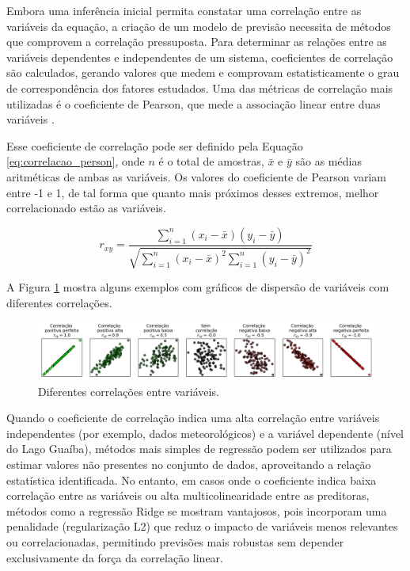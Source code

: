 Embora uma inferência inicial permita constatar uma correlação entre as variáveis da equação, a criação de um modelo de previsão necessita de métodos que comprovem a correlação pressuposta. Para determinar as relações entre as variáveis dependentes e independentes de um sistema, coeficientes de correlação são calculados, gerando valores que medem e comprovam estatisticamente o grau de correspondência dos fatores estudados. Uma das métricas de correlação mais utilizadas é o coeficiente de Pearson, que mede a associação linear entre duas variáveis \cite{kirch2008}. 

Esse coeficiente de correlação pode ser definido pela Equação \ref{eq:correlacao_person}, onde $n$ é o total de amostras, $\bar{x}$ e $\bar{y}$ são as médias aritméticas de ambas as variáveis. Os valores do coeficiente de Pearson variam entre -1 e 1, de tal forma que quanto mais próximos desses extremos, melhor correlacionado estão as variáveis.

\begin{equation}
    r_{xy} = \frac{\sum_{i=1}^n (x_i - \bar{x})(y_i - \bar{y})}{\sqrt{\sum_{i=1}^n (x_i - \bar{x})^2 \sum_{i=1}^n (y_i - \bar{y})^2}}
    \label{eq:correlacao_person}
\end{equation}

A Figura \ref{fig:correlacoes} mostra alguns exemplos com gráficos de dispersão de variáveis com diferentes correlações.

\begin{figure}[H]
	\caption{\label{fig:correlacoes}Diferentes correlações entre variáveis.}
	\begin{center}
		\includegraphics[scale=0.4]{figuras/correlations.png}
	\end{center}
\end{figure}

Quando o coeficiente de correlação indica uma alta correlação entre variáveis independentes (por exemplo, dados meteorológicos) e a variável dependente (nível do Lago Guaíba), métodos mais simples de regressão podem ser utilizados para estimar valores não presentes no conjunto de dados, aproveitando a relação estatística identificada. No entanto, em casos onde o coeficiente indica baixa correlação entre as variáveis ou alta multicolinearidade entre as preditoras, métodos como a regressão Ridge se mostram vantajosos, pois incorporam uma penalidade (regularização L2) que reduz o impacto de variáveis menos relevantes ou correlacionadas, permitindo previsões mais robustas sem depender exclusivamente da força da correlação linear.

